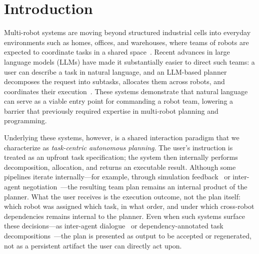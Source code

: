 \section{Introduction}
\label{sec:introduction}

Multi-robot systems are moving beyond structured industrial cells into everyday environments such as homes, offices, and warehouses, where teams of robots are expected to coordinate tasks in a shared space~\cite{}.
Recent advances in large language models (LLMs) have made it substantially easier to direct such teams: a user can describe a task in natural language, and an LLM-based planner decomposes the request into subtasks, allocates them across robots, and coordinates their execution~\cite{chen2025emos, zhang2025lamma, kannan2024smart, singh2022progprompt}. %
These systems demonstrate that natural language can serve as a viable entry point for commanding a robot team, lowering a barrier that previously required expertise in multi-robot planning and programming.

Underlying these systems, however, is a shared interaction paradigm that we characterize as \emph{task-centric autonomous planning}.
The user's instruction is treated as an upfront task specification; the system then internally performs decomposition, allocation, and returns an executable result.
Although some pipelines iterate internally---for example, through simulation feedback~\cite{COHERENT} or inter-agent negotiation~\cite{mandi2024roco}---the resulting team plan remains an internal product of the planner.
What the user receives is the execution outcome, not the plan itself: which robot was assigned which task, in what order, and under which cross-robot dependencies remains internal to the planner.
Even when such systems surface these decisions---as inter-agent dialogue~\cite{chen2024scalable} or dependency-annotated task decompositions~\cite{wang2024dartllm}---the plan is presented as output to be accepted or regenerated, not as a persistent artifact the user can directly act upon.

